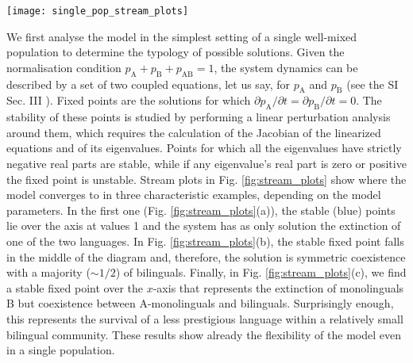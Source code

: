 \documentclass[../thesis.tex]{subfiles}
\begin{document}
\begin{figure*}
    \centering
    \texttt{[image: single\_pop\_stream\_plots]}
    \caption{Flow diagrams for the dynamics of two languages according to our model
    described in equation \eqref{eq:bipref_model} set in a well-mixed population.
    $p_{\text{A}}$ and $p_{\text{B}}$ denote the proportions of monolinguals in A and B,
    respectively, and the proportion of bilinguals $p_{\text{AB}}$ is such that
    $p_{\text{A}} + p_{\text{B}} + p_{\text{AB}} = 1$. The mortality rate is fixed at
    $\mu = 0.02$. (a) For $s = q = 1/2$ and $c=0.02$, the stable outcome is
    extinction of one of the two languages. (b) For $s = q = 1/2$ and $c =
    0.05$, the higher learning rate leads to a solution featuring stable coexistence.
    (c) For $s = 0.57$, $q = 0.45$ and $c = 0.05$, despite the lower prestige,
    B survives in a small community of bilinguals as it is the preferred language among
    them.}
    \label{fig:stream_plots}
\end{figure*}

We first analyse the model in the simplest setting of a single well-mixed population to
determine the typology of possible solutions. Given the normalisation condition
$p_\text{A}+p_\text{B}+p_\text{AB} = 1$, the system dynamics can be described by a set
of two coupled equations, let us say, for $p_\text{A}$ and $p_\text{B}$ (see the SI Sec.
III \cite{supp}). Fixed points are the solutions for which $\partial p_\text{A}/\partial
t = \partial p_\text{B}/\partial t = 0$. The stability of these points is studied by
performing a linear perturbation analysis around them, which requires the calculation of
the Jacobian of the linearized equations and of its eigenvalues. Points for which all
the eigenvalues have strictly negative real parts are stable, while if any eigenvalue's
real part is zero or positive the fixed point is unstable. Stream plots in Fig.
\ref{fig:stream_plots} show where the model converges to in three characteristic
examples, depending on the model parameters. In the first one (Fig.
\ref{fig:stream_plots}(a)), the stable (blue) points lie over the axis at values
1 and the system has as only solution the extinction of one of the two languages. In
Fig. \ref{fig:stream_plots}(b), the stable fixed point falls in the middle of the
diagram and, therefore, the solution is symmetric coexistence with a majority ($\sim
1/2$) of bilinguals. Finally, in Fig. \ref{fig:stream_plots}(c), we find a stable
fixed point over the $x$-axis that represents the extinction of monolinguals B but
coexistence between A-monolinguals and bilinguals. Surprisingly enough, this represents
the survival of a less prestigious language within a relatively small bilingual
community. These results show already the flexibility of the model even in a single
population.
\end{document}
